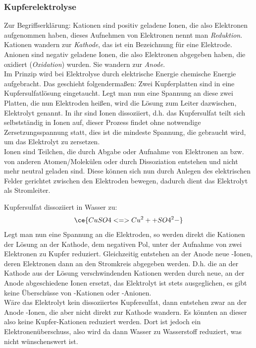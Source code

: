 \subsubsection{Kupferelektrolyse}
Zur Begriffserklärung: Kationen sind positiv geladene Ionen, die also Elektronen aufgenommen haben, dieses Aufnehmen von Elektronen nennt man \emph{Reduktion}. Kationen wandern zur \emph{Kathode}, das ist ein Bezeichnung für eine Elektrode. Anionen sind negativ geladene Ionen, die also Elektronen abgegeben haben, die oxidiert (\emph{Oxidation}) wurden. Sie wandern zur \emph{Anode}.\\
Im Prinzip wird bei Elektrolyse durch elektrische Energie chemische Energie aufgebracht. Das geschieht folgendermaßen: Zwei Kupferplatten sind in eine Kupfersulfatlösung eingetaucht. Legt man nun eine Spannung an diese zwei Platten, die nun Elektroden heißen, wird die Lösung zum Leiter dazwischen, Elektrolyt genannt. In ihr sind Ionen dissoziiert, d.h. das Kupfersulfat teilt sich selbstständig in Ionen auf, dieser Prozess findet ohne notwendige Zersetzungsspannung statt, dies ist die mindeste Spannung, die gebraucht wird, um das Elektrolyt zu zersetzen.\\
Ionen sind Teilchen, die durch Abgabe oder Aufnahme von Elektronen an bzw. von anderen Atomen/Molekülen oder durch Dissoziation entstehen und nicht mehr neutral geladen sind. Diese können sich nun durch Anlegen des elektrischen Felder gerichtet zwischen den Elektroden bewegen, dadurch dient das Elektrolyt als Stromleiter.

Kupfersulfat dissoziiert in Wasser zu:
\begin{equation}
    \ce{CuSO4 <=> Cu^2+ + SO4^2-}
\end{equation}
Legt man nun eine Spannung an die Elektroden, so werden direkt die  Kationen der Lösung an der Kathode, dem negativen Pol, unter der Aufnahme von zwei Elektronen zu Kupfer reduziert. Gleichzeitig entstehen an der Anode neue -Ionen, deren Elektronen dann an den Stromkreis \glqq abgegeben\grqq{} werden. D.h. die an der Kathode aus der Lösung verschwindenden Kationen werden durch neue, an der Anode abgeschiedene Ionen ersetzt, das Elektrolyt ist stets ausgeglichen, es gibt keine Überschüsse von -Kationen oder -Anionen. \\Wäre das Elektrolyt kein dissoziiertes Kupfersulfat, dann entstehen zwar an der Anode -Ionen, die aber nicht direkt zur Kathode wandern. Es könnten an dieser also keine Kupfer-Kationen reduziert werden. Dort ist jedoch ein Elektronenüberschuss, also wird da dann Wasser zu Wasserstoff reduziert, was nicht wünschenswert ist.

